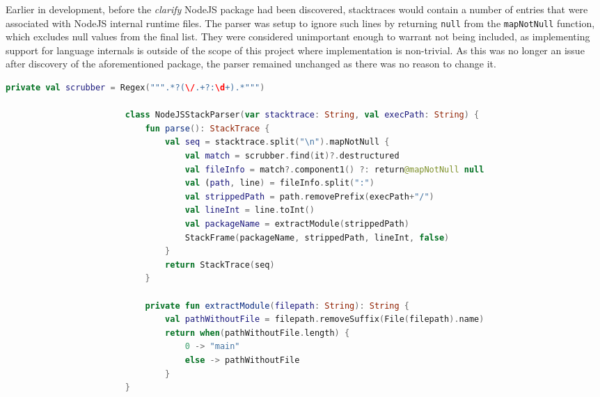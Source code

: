 \documentclass[12pt,pdftex,titlepage]{report}
\begin{document}
                Earlier in development, before the \textit{clarify}{\cite{clarify}} NodeJS package had been discovered, stacktraces would contain a number of entries that were associated with NodeJS internal 
                runtime files. The parser was setup to ignore such lines by returning \texttt{null} from the \texttt{mapNotNull} function, which excludes null values from the final list. They were considered unimportant 
                enough to warrant not being included, as implementing support for language internals is outside of the scope of this project where implementation is non-trivial. As this was no longer an issue
                after discovery of the aforementioned package, the parser remained unchanged as there was no reason to change it.

                \newpage
                \begin{spacing}{1.0}
                    \begin{lstlisting}[language=Kotlin, gobble=24, label={lst:nodeparser}, caption={The NodeJS Stack parser class }]
                        private val scrubber = Regex(""".*?(\/.+?:\d+).*""")

                        class NodeJSStackParser(var stacktrace: String, val execPath: String) {
                            fun parse(): StackTrace {
                                val seq = stacktrace.split("\n").mapNotNull {
                                    val match = scrubber.find(it)?.destructured
                                    val fileInfo = match?.component1() ?: return@mapNotNull null
                                    val (path, line) = fileInfo.split(":")
                                    val strippedPath = path.removePrefix(execPath+"/")
                                    val lineInt = line.toInt()
                                    val packageName = extractModule(strippedPath)
                                    StackFrame(packageName, strippedPath, lineInt, false)
                                }
                                return StackTrace(seq)
                            }
                            
                            private fun extractModule(filepath: String): String {
                                val pathWithoutFile = filepath.removeSuffix(File(filepath).name)
                                return when(pathWithoutFile.length) {
                                    0 -> "main"
                                    else -> pathWithoutFile
                                }
                        }
                    \end{lstlisting}
                \end{spacing}
                \bigskip
\end{document}
